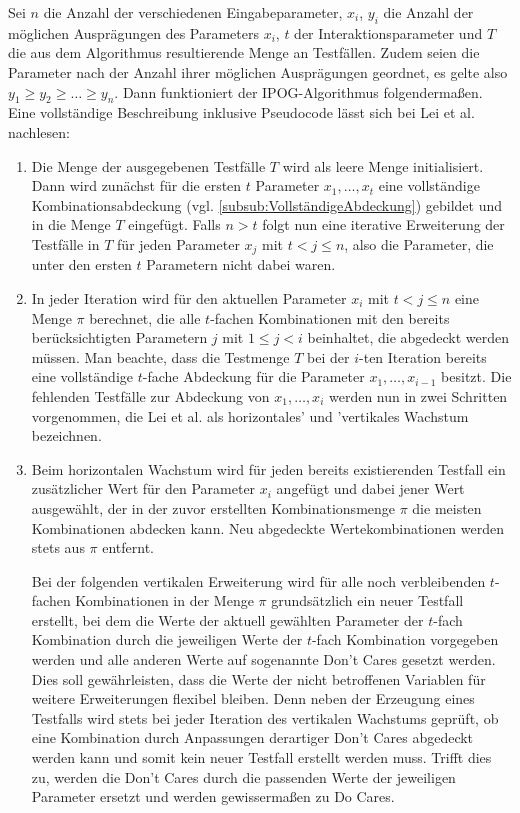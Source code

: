 Sei $n$ die Anzahl der verschiedenen Eingabeparameter, $x_i$, $y_i$ die Anzahl der möglichen Ausprägungen des Parameters $x_i$, $t$ der Interaktionsparameter und $T$ die aus dem Algorithmus resultierende Menge an Testfällen. Zudem seien die Parameter nach der Anzahl ihrer möglichen Ausprägungen geordnet, es gelte also $y_1 \geq y_2 \geq \dots \geq y_n$. Dann funktioniert der IPOG-Algorithmus folgendermaßen. Eine vollständige Beschreibung inklusive Pseudocode lässt sich bei Lei et al. \cite{lei2008ipog} nachlesen:
\begin{enumerate}
\item Die Menge der ausgegebenen Testfälle $T$ wird als leere Menge initialisiert. Dann wird zunächst für die ersten $t$ Parameter $x_1,\dots,x_t$ eine vollständige Kombinationsabdeckung (vgl. \autoref{subsub:VollständigeAbdeckung}) gebildet und in die Menge $T$ eingefügt. Falls $n > t$ folgt nun eine iterative Erweiterung der Testfälle in $T$ für jeden Parameter $x_j$ mit $t < j \leq n$, also die Parameter, die unter den ersten $t$ Parametern nicht dabei waren.
\item In jeder Iteration wird für den aktuellen Parameter $x_i$ mit $t < j \leq n$ eine Menge $\pi$ berechnet, die alle $t$-fachen Kombinationen mit den bereits berücksichtigten Parametern $j$ mit $1 \leq j < i$ beinhaltet, die abgedeckt werden müssen. Man beachte, dass die Testmenge $T$ bei der $i$-ten Iteration bereits eine vollständige $t$-fache Abdeckung für die Parameter $x_1,\dots,x_{i-1}$ besitzt. Die fehlenden Testfälle zur Abdeckung von $x_1,\dots,x_i$ werden nun in zwei Schritten vorgenommen, die Lei et al. als \glqq horizontales' und 'vertikales Wachstum\grqq{} \cite{lei2008ipog} bezeichnen.
\item Beim horizontalen Wachstum wird für jeden bereits existierenden Testfall ein zusätzlicher Wert für den Parameter $x_i$ angefügt und dabei jener Wert ausgewählt, der in der zuvor erstellten Kombinationsmenge $\pi$ die meisten Kombinationen abdecken kann. Neu abgedeckte Wertekombinationen werden stets aus $\pi$ entfernt.

Bei der folgenden vertikalen Erweiterung wird für alle noch verbleibenden $t$-fachen Kombinationen in der Menge $\pi$ grundsätzlich ein neuer Testfall erstellt, bei dem die Werte der aktuell gewählten Parameter der $t$-fach Kombination durch die jeweiligen Werte der $t$-fach Kombination vorgegeben werden und alle anderen Werte auf sogenannte \glqq Don't Cares\grqq{} gesetzt werden. Dies soll gewährleisten, dass die Werte der nicht betroffenen Variablen für weitere Erweiterungen flexibel bleiben. Denn neben der Erzeugung eines Testfalls wird stets bei jeder Iteration des vertikalen Wachstums geprüft, ob eine Kombination durch Anpassungen derartiger \glqq Don't Cares\grqq{} abgedeckt werden kann und somit kein neuer Testfall erstellt werden muss. Trifft dies zu, werden die \glqq Don't Cares\grqq{} durch die passenden Werte der jeweiligen Parameter ersetzt und werden gewissermaßen zu \glqq Do Cares\grqq{}.
\end{enumerate}

